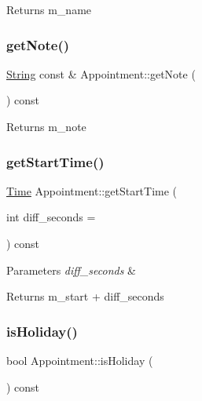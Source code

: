 \begin{DoxyReturn}{Returns}
m\+\_\+name 
\end{DoxyReturn}
\mbox{\label{classAppointment_aaf6078fe8f092e321a38d173bc7093c3}} 
\subsubsection{\texorpdfstring{get\+Note()}{getNote()}}
{\footnotesize\ttfamily \hyperlink{classString}{String} const  \& Appointment\+::get\+Note (\begin{DoxyParamCaption}{ }\end{DoxyParamCaption}) const}

\begin{DoxyReturn}{Returns}
m\+\_\+note 
\end{DoxyReturn}
\mbox{\label{classAppointment_a577870c4d05eb584d58c61c98b9b65a0}} 
\subsubsection{\texorpdfstring{get\+Start\+Time()}{getStartTime()}}
{\footnotesize\ttfamily \hyperlink{classTime}{Time} Appointment\+::get\+Start\+Time (\begin{DoxyParamCaption}\item[{int}]{diff\+\_\+seconds = {} }\end{DoxyParamCaption}) const}


\begin{DoxyParams}{Parameters}
{\em diff\+\_\+seconds} & \\
\hline
\end{DoxyParams}
\begin{DoxyReturn}{Returns}
m\+\_\+start + diff\+\_\+seconds 
\end{DoxyReturn}
\mbox{\label{classAppointment_a0307e814d106ba2b2314a28a9701efae}} 
\subsubsection{\texorpdfstring{is\+Holiday()}{isHoliday()}}
{\footnotesize\ttfamily bool Appointment\+::is\+Holiday (\begin{DoxyParamCaption}{ }\end{DoxyParamCaption}) const}

